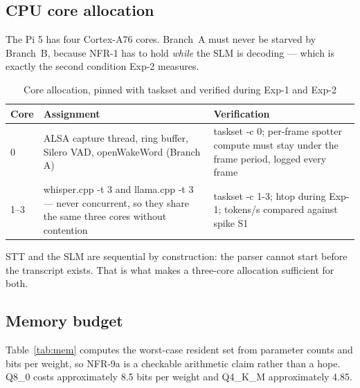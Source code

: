 \documentclass[11pt,a4paper]{article}
\newcommand{\code}[1]{{\ttfamily\small #1}}
\begin{document}
\subsection{CPU core allocation}

The Pi 5 has four Cortex-A76 cores. Branch~A must never be starved by Branch~B, because NFR-1 has to hold
\emph{while} the SLM is decoding --- which is exactly the second condition Exp-2 measures.

\begin{table}[htbp]
\centering
\caption{Core allocation, pinned with \code{taskset} and verified during Exp-1 and Exp-2}
\label{tab:cores}
\small
\begin{tabular}{@{}P{0.10}P{0.45}P{0.35}@{}}
\toprule
\textbf{Core} & \textbf{Assignment} & \textbf{Verification} \\
     & ALSA capture thread, ring buffer, Silero VAD, openWakeWord (Branch A) &
  \code{taskset -c 0}; per-frame spotter compute must stay under the frame period, logged every frame \\
1--3  & \code{whisper.cpp -t 3} and \code{llama.cpp -t 3} --- never concurrent, so they share the same
  three cores without contention &
  \code{taskset -c 1-3}; \code{htop} during Exp-1; tokens/s compared against spike S1 \\
\bottomrule
\end{tabular}
\end{table}

STT and the SLM are sequential by construction: the parser cannot start before the transcript exists.
That is what makes a three-core allocation sufficient for both.

\subsection{Memory budget}

Table~\ref{tab:mem} computes the worst-case resident set from parameter counts and bits per weight, so
NFR-9a is a checkable arithmetic claim rather than a hope. Q8\_0 costs approximately 8.5 bits per weight
and Q4\_K\_M approximately 4.85.
\end{document}
